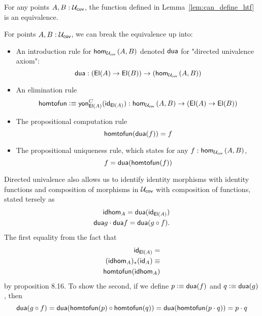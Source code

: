 \documentclass[main.tex]{subfiles}
\begin{document}
\begin{axiom}
    For any points $A,B : \uc$, the function defined in Lemma~\ref{lem:can_define_htf} is an equivalence.
\end{axiom}

For points $A,B : \uc$, we can break the equivalence up into:
\begin{itemize}
    \item An introduction rule for $\ho[\uc]{A}{B}$ denoted $\dua$ for "directed univalence axiom":
    $$\dua : (\El(A) \to \El(B)) \to (\ho[\uc]{A}{B})$$
    \item An elimination rule
    $$\htf \defeq \yon{C}{\El(A)}(\id{\El(A)}) : \ho[\uc]{A}{B} \to (\El(A) \to \El(B))$$
    \item The propositional computation rule
        $$\htf(\dua(f)) = f$$
    \item The propositional uniqueness rule, which states for any $f : \ho[\uc]{A} {B}$,
    $$f = \dua(\htf(f))$$
\end{itemize}
Directed univalence also allows us to  identify identity morphisms with identity functions and composition of morphisms in $\uc$ with composition of functions, stated tersely as
\begin{align*}
    \idhom{A} = \dua(\id{\El(A)})\\
    \dua{g}\cdot\dua{f} = \dua(g \circ f).
\end{align*}
The first equality from the fact that \begin{align*}
\id{\El(A)} = \\
(\idhom{A})_*(\id{A}) \equiv \\
\htf(\idhom{A})
\end{align*} by proposition 8.16. To show the second, if we define $p \defeq \dua(f)$ and $q \defeq \dua(g)$, then
    $$\dua(g \circ f) = \dua(\htf(p) \circ \htf(q)) = \dua(\htf(p \cdot q)) = p \cdot q$$
\end{document}
